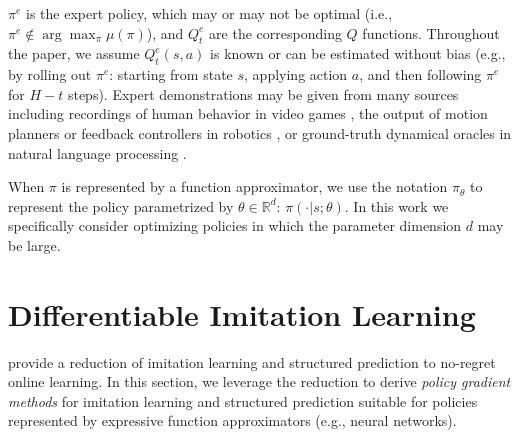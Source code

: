 \documentclass{article}
\begin{document}
$\pi^{e}$ is the expert policy, which may or may not be optimal (i.e., $\pi^e \not\in \arg\max_{\pi} \mu(\pi)$), and $Q_t^{e}$ are the corresponding $Q$ functions. Throughout the paper, we assume $Q_t^{e}(s,a)$ is known or can be estimated without bias (e.g., by rolling out $\pi^e$: starting from state $s$, applying action $a$, and then following $\pi^e$ for $H-t$ steps). Expert demonstrations may be given from many sources including recordings of human behavior in video games \cite{Ross2011_AISTATS}, the output of motion planners or feedback controllers in robotics \cite{kahn2016plato}, or ground-truth  dynamical oracles in natural language processing \cite{chang2015learning_dependency,chang2015learning}.

When $\pi$ is represented by a function approximator, we use the notation $\pi_{\theta}$ to represent the policy parametrized by $\theta\in \mathbb{R}^{d}$: $\pi(\cdot|s;\theta)$. In this work we specifically consider optimizing policies in which the parameter dimension $d$ may be large. 




\section{Differentiable Imitation Learning}
\label{sec:alg}
\citet{ross2014reinforcement} provide a reduction of imitation learning and structured prediction to no-regret online learning. In this section, we leverage the reduction to derive \emph{policy gradient methods} for imitation learning and structured prediction suitable for policies represented by expressive function approximators (e.g., neural networks).
\end{document}

